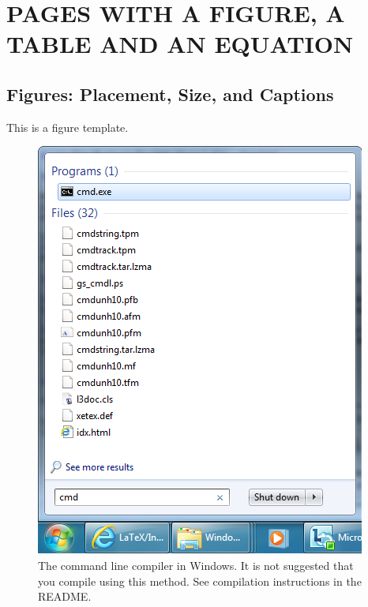 %
%
%
%
%



\chapter{PAGES WITH A FIGURE, A TABLE AND AN EQUATION}
\section{Figures: Placement, Size, and Captions}
This is a figure template.
\begin{figure}[ht]
	\centering
	\includegraphics[scale=0.75]{images/TAMUthesis_CMD_windows.png}
	\caption[The command line compiler in Windows.]{The command line compiler in Windows. It is not suggested that you compile using this method. See compilation instructions in the README.}

	\label{fig:CMD_1}

\end{figure}

